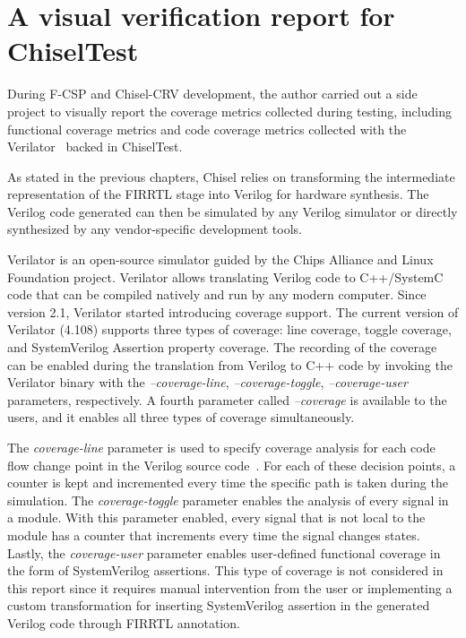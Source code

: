 \chapter{A visual verification report for ChiselTest}
During F-CSP and Chisel-CRV development, the author carried out a side project
to visually report the coverage metrics collected during testing, including
functional coverage metrics and code coverage metrics collected with the
Verilator~\cite{verilator} backed in ChiselTest.

As stated in the previous chapters, Chisel relies on transforming the
intermediate representation of the FIRRTL stage into Verilog for hardware
synthesis. The Verilog code generated can then be simulated by any Verilog
simulator or directly synthesized by any vendor-specific development tools.

Verilator is an open-source simulator guided by the Chips Alliance and Linux
Foundation project. Verilator allows translating Verilog code to C++/SystemC
code that can be compiled natively and run by any modern computer. Since version
2.1, Verilator started introducing coverage support. The current version of
Verilator (4.108) supports three types of coverage: line coverage, toggle
coverage, and SystemVerilog Assertion property coverage. The recording of the
coverage can be enabled during the translation from Verilog to C++ code by
invoking the Verilator binary with the \textit{--coverage-line},
\textit{--coverage-toggle}, \textit{--coverage-user} parameters, respectively. A
fourth parameter called \textit{--coverage} is available to the users, and it
enables all three types of coverage simultaneously.

The \textit{coverage-line} parameter is used to specify coverage analysis for
each code flow change point in the Verilog source code~\cite{verilatormanual}.
For each of these decision points, a counter is kept and incremented every time
the specific path is taken during the simulation. The \textit{coverage-toggle}
parameter enables the analysis of every signal in a module. With this parameter
enabled, every signal that is not local to the module has a counter that
increments every time the signal changes states. Lastly, the
\textit{coverage-user} parameter enables user-defined functional coverage in the
form of SystemVerilog assertions. This type of coverage is not considered in
this report since it requires manual intervention from the user or implementing
a custom transformation for inserting SystemVerilog assertion in the generated
Verilog code through FIRRTL annotation.

